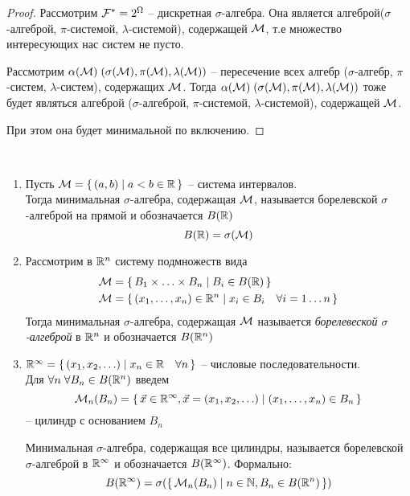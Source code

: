 \begin{proof}
	Рассмотрим $\mathcal{F}^* = 2^{\Omega}$ -- дискретная $\sigma$-алгебра. 
	Она является алгеброй($\sigma$-алгеброй, $\pi$-системой, $\lambda$-системой), 
	содержащей $\mathcal{M}$, т.е множество интересующих нас систем не пусто.
	
	Рассмотрим $\alpha(\mathcal{M})\; (\sigma(\mathcal{M}), \pi(\mathcal{M}), \lambda(\mathcal{M}))$ 
	-- пересечение всех алгебр ($\sigma$-алгебр, $\pi$-систем, $\lambda$-систем), содержащих $\mathcal{M}$. 
	Тогда $\alpha(\mathcal{M})\; (\sigma(\mathcal{M}), \pi(\mathcal{M}), \lambda(\mathcal{M}))$ тоже будет являться алгеброй 
	($\sigma$-алгеброй, $\pi$-системой, $\lambda$-системой), содержащей $\mathcal{M}$.

	При этом она будет минимальной по включению.
\end{proof}

\begin{example}~

	\begin{enumerate}
		\item 
			Пусть $\mathcal{M} = \left\{ \, (a, b) \mid a < b \in \mathbb{R} \, \right\}$ -- система интервалов.\\
			Тогда минимальная $\sigma$-алгебра, содержащая $\mathcal{M}$, 
			называется борелевской $\sigma$-алгеброй на прямой и обозначается $B(\mathbb{R})$\\
			\begin{equation*}
				B(\mathbb{R}) = \sigma(\mathcal{M})
			\end{equation*}
				
		\item 
			Рассмотрим в $\mathbb{R}^n$ систему подмножеств вида
			\begin{align*}
				&\mathcal{M} = \left\{ \, B_1 \times \ldots \times B_n \mid B_i \in B(\mathbb{R}) \, \right\}\\
				&\mathcal{M} = \left\{ \, (x_1, \ldots, x_n) \in \mathbb{R}^n \mid x_i \in B_i \quad \forall i = 1 \ldots n \, \right\}
			\end{align*}
			Тогда минимальная $\sigma$-алгебра, содержащая $\mathcal{M}$ называется 
			\emph{борелевеской $\sigma$-алгеброй} в $\mathbb{R}^n$  и обозначается $B(\mathbb{R}^n)$
			 
		\item 
			$\mathbb{R}^{\infty} = \left\{ \,  (x_1, x_2, \ldots ) \mid x_n \in \mathbb{R} \quad \forall n  \, \right\}$ 
			-- числовые последовательности.\\
			Для $\forall n\; \forall B_n \in B(\mathbb{R}^n)$ введем
			\begin{equation*}
				\mathcal{M}_n(B_n) = \left\{ \, \vec{x} \in \mathbb{R}^{\infty}, \vec{x} = (x_1, x_2, \ldots ) \mid (x_1, \ldots, x_n) \in B_n \, \right\}
			\end{equation*} -- цилиндр с основанием $B_n$
		
		Минимальная $\sigma$-алгебра, содержащая все цилиндры, называется борелевской 
		$\sigma$-алгеброй в $\mathbb{R}^{\infty}$ и обозначается $B(\mathbb{R}^{\infty})$. Формально:
		\begin{equation*}
			B(\mathbb{R}^{\infty}) = \sigma(\left\{ \, \mathcal{M}_n(B_n) \mid n \in \mathbb{N}, B_n \in B(\mathbb{R}^n) \, \right\})
		\end{equation*}
	\end{enumerate}
\end{example}

